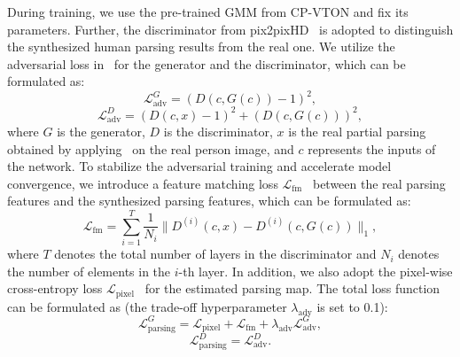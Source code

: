 \documentclass[sigconf]{acmart}
\begin{document}
During training, we use the pre-trained GMM from CP-VTON and fix its parameters. Further, the discriminator from pix2pixHD~\cite{wang2018pix2pixHD} is adopted to distinguish the synthesized human parsing results from the real one.
We utilize the adversarial loss in~\cite{mao2017lsgan} for the generator and the discriminator, which can be formulated as:
\begin{equation}
\mathcal{L}_{\text{adv}}^G=(D(c,G(c))-1)^2,
\label{eq:parsing_adv_g}
\end{equation}
\begin{equation}
\mathcal{L}_{\text{adv}}^D=(D(c,x)-1)^2+(D(c,G(c)))^2,
\label{eq:parsing_adv_d}
\end{equation}
where $G$ is the generator, $D$ is the discriminator, $x$ is the real partial parsing obtained by applying~\cite{Gong_2019_CVPR} on the real person image, and $c$ represents the inputs of the network.
To stabilize the adversarial training and accelerate model convergence, we introduce a feature matching loss $\mathcal{L}_{\text{fm}}$~\cite{wang2018pix2pixHD} between the real parsing features and the synthesized parsing features, which can be formulated as:
\begin{equation}
    \mathcal{L}_{\text{fm}} = \sum_{i=1}^T\frac{1}{N_i}\|D^{(i)}(c,x)-D^{(i)}(c,G(c))\|_1,
\end{equation}
where $T$ denotes the total number of layers in the discriminator and $N_i$ denotes the number of elements in the $i$-th layer. In addition, we also adopt the pixel-wise cross-entropy loss $\mathcal{L}_{\text{pixel}}$~\cite{gong2017lip} for the estimated parsing map. The total loss function can be formulated as (the trade-off hyperparameter $\lambda_{\text{adv}}$ is set to 0.1):
\begin{equation}
    \mathcal{L}_{\text{parsing}}^G =\mathcal{L}_{\text{pixel}} + \mathcal{L}_{\text{fm}} + \lambda_{\text{adv}}\mathcal{L}_{\text{adv}}^G,
\end{equation}
\begin{equation}
    \mathcal{L}_{\text{parsing}}^D = \mathcal{L}_{\text{adv}}^D.
\end{equation}
\end{document}
